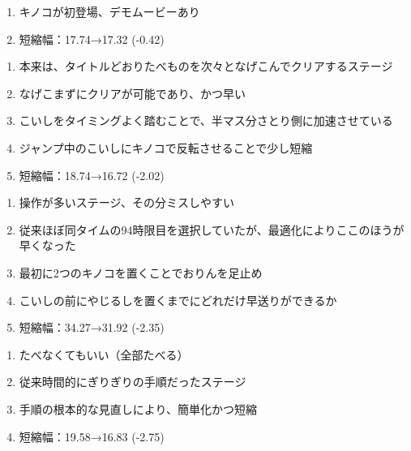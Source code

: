\begin{enumerate}[label={\sarrow}]
\item キノコが初登場、デモムービーあり
\item 短縮幅：17.74→17.32 (-0.42)
\end{enumerate}



\begin{enumerate}[label={\sarrow}]
\item 本来は、タイトルどおりたべものを次々となげこんでクリアするステージ
\item なげこまずにクリアが可能であり、かつ早い
\item こいしをタイミングよく踏むことで、半マス分さとり側に加速させている
\item ジャンプ中のこいしにキノコで反転させることで少し短縮
\item 短縮幅：18.74→16.72 (-2.02)
\end{enumerate}



\clearpage
\begin{enumerate}[label={\sarrow}]
\item 操作が多いステージ、その分ミスしやすい
\item 従来ほぼ同タイムの94時限目を選択していたが、最適化によりここのほうが早くなった
\item 最初に2つのキノコを置くことでおりんを足止め
\item こいしの前にやじるしを置くまでにどれだけ早送りができるか
\item 短縮幅：34.27→31.92 (-2.35)
\end{enumerate}



\begin{enumerate}[label={\sarrow}]
\item たべなくてもいい（全部たべる）
\item 従来時間的にぎりぎりの手順だったステージ
\item 手順の根本的な見直しにより、簡単化かつ短縮
\item 短縮幅：19.58→16.83 (-2.75)
\end{enumerate}



